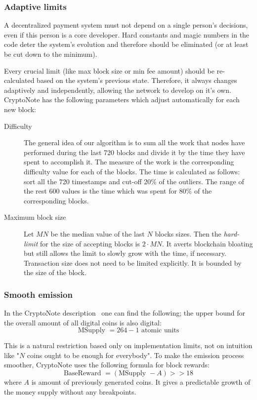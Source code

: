 \subsubsection{Adaptive limits}
A decentralized payment system must not depend on a single person's decisions, even if this person is a core developer. Hard constants and magic numbers in the code deter the system's evolution and therefore should be eliminated (or at least be cut down to the minimum).

Every crucial limit (like max block size or min fee amount) should be re-calculated based on the system's previous state. Therefore, it always changes adaptively and independently, allowing the network to develop on it's own. CryptoNote has the following parameters which adjust automatically for each new block:
\clearpage
\pagebreak

\begin{description}
  \item [Difficulty] The general idea of our algorithm is to sum all the work that nodes have performed during the last 720 blocks and divide it by the time they have spent to accomplish it. The measure of the work is the corresponding difficulty value for each of the blocks. The time is calculated as follows: sort all the 720 timestamps and cut-off 20\% of the outliers. The range of the rest 600 values is the time which was spent for 80\% of the corresponding blocks.
  \item [Maximum block size] Let $MN$ be the median value of the last $N$ blocks sizes. Then the \emph{hard-limit} for the size of accepting blocks is $2 \cdot MN$. It averts blockchain bloating but still allows the limit to slowly grow with the time, if necessary. Transaction size does not need to be limited explicitly. It is bounded by the size of the block.
\end{description}

\subsubsection{Smooth emission}
In the CryptoNote description~\cite{cryptonote} one can find the following; the upper bound for the overall amount of all digital coins is also digital:
\begin{equation}
  \mbox{MSupply } = 264 − 1 \mbox{ atomic units}
\end{equation}

This is a natural restriction based only on implementation limits, not on intuition like "$N$ coins ought to be enough for everybody". To make the emission process smoother, CryptoNote uses the following formula for block rewards:
\begin{equation}
  \mbox{BaseReward } = (\mbox{MSupply } - A) >> 18
\end{equation}
where $A$ is amount of previously generated coins. It gives a predictable growth of the money supply without any breakpoints.


